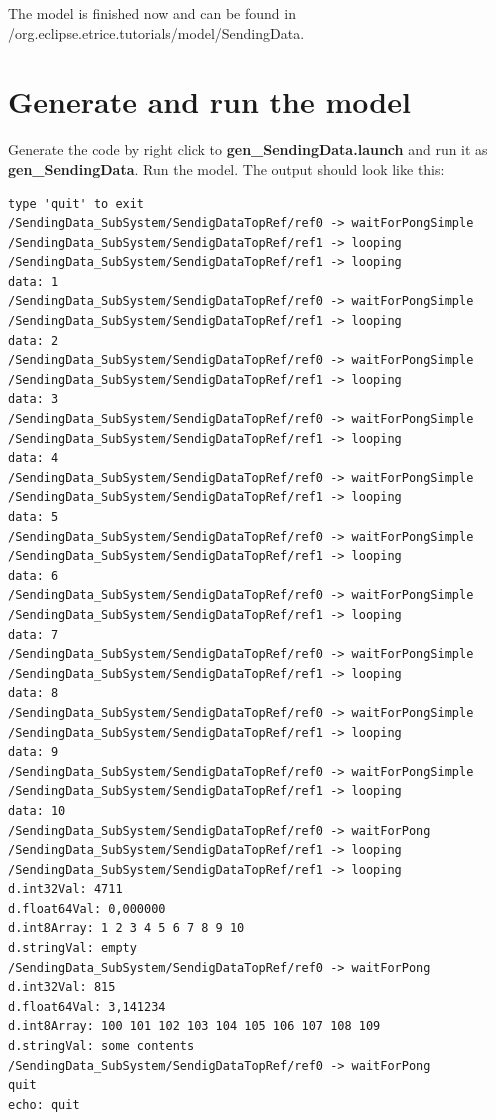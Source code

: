 \begin{flushleft}The model is finished now and can be found in 
/org.eclipse.etrice.tutorials/model/SendingData.\end{flushleft}

\section{Generate and run the model}

Generate the code by right click to \textbf{gen\_SendingData.launch} and run it as 
\textbf{gen\_SendingData}. Run the model. 
The output should look like this:

\begin{verbatim}
type 'quit' to exit
/SendingData_SubSystem/SendigDataTopRef/ref0 -> waitForPongSimple
/SendingData_SubSystem/SendigDataTopRef/ref1 -> looping
/SendingData_SubSystem/SendigDataTopRef/ref1 -> looping
data: 1
/SendingData_SubSystem/SendigDataTopRef/ref0 -> waitForPongSimple
/SendingData_SubSystem/SendigDataTopRef/ref1 -> looping
data: 2
/SendingData_SubSystem/SendigDataTopRef/ref0 -> waitForPongSimple
/SendingData_SubSystem/SendigDataTopRef/ref1 -> looping
data: 3
/SendingData_SubSystem/SendigDataTopRef/ref0 -> waitForPongSimple
/SendingData_SubSystem/SendigDataTopRef/ref1 -> looping
data: 4
/SendingData_SubSystem/SendigDataTopRef/ref0 -> waitForPongSimple
/SendingData_SubSystem/SendigDataTopRef/ref1 -> looping
data: 5
/SendingData_SubSystem/SendigDataTopRef/ref0 -> waitForPongSimple
/SendingData_SubSystem/SendigDataTopRef/ref1 -> looping
data: 6
/SendingData_SubSystem/SendigDataTopRef/ref0 -> waitForPongSimple
/SendingData_SubSystem/SendigDataTopRef/ref1 -> looping
data: 7
/SendingData_SubSystem/SendigDataTopRef/ref0 -> waitForPongSimple
/SendingData_SubSystem/SendigDataTopRef/ref1 -> looping
data: 8
/SendingData_SubSystem/SendigDataTopRef/ref0 -> waitForPongSimple
/SendingData_SubSystem/SendigDataTopRef/ref1 -> looping
data: 9
/SendingData_SubSystem/SendigDataTopRef/ref0 -> waitForPongSimple
/SendingData_SubSystem/SendigDataTopRef/ref1 -> looping
data: 10
/SendingData_SubSystem/SendigDataTopRef/ref0 -> waitForPong
/SendingData_SubSystem/SendigDataTopRef/ref1 -> looping
/SendingData_SubSystem/SendigDataTopRef/ref1 -> looping
d.int32Val: 4711
d.float64Val: 0,000000
d.int8Array: 1 2 3 4 5 6 7 8 9 10 
d.stringVal: empty
/SendingData_SubSystem/SendigDataTopRef/ref0 -> waitForPong
d.int32Val: 815
d.float64Val: 3,141234
d.int8Array: 100 101 102 103 104 105 106 107 108 109 
d.stringVal: some contents
/SendingData_SubSystem/SendigDataTopRef/ref0 -> waitForPong
quit
echo: quit
\end{verbatim}

